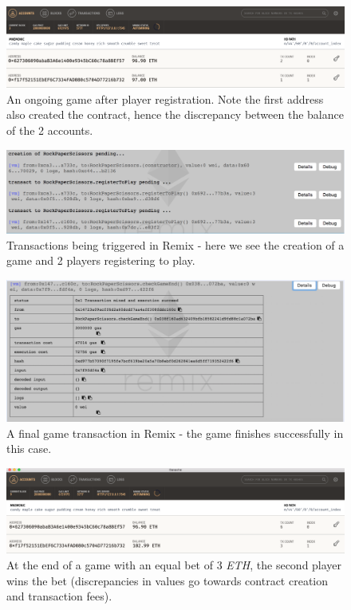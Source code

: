 \documentclass[a4paper, twoside]{article}
\begin{document}
\begin{figure}[!h]
	\centering
	\includegraphics[width=\textwidth]{screens/postRegistration.png}	
	\caption{An ongoing game after player registration. Note the first address also created the contract, hence the discrepancy between the balance of the 2 accounts.}
\end{figure}
\begin{figure}[!h]
	\centering
	\includegraphics[width=\textwidth]{screens/initialTransactions.png}	
	\caption{Transactions being triggered in Remix - here we see the creation of a game and 2 players registering to play.}
\end{figure}
\begin{figure}[!h]
	\centering
	\includegraphics[width=\textwidth]{screens/gameEnd.png}	
	\caption{A final game transaction in Remix - the game finishes successfully in this case.}
\end{figure}
\begin{figure}[!h]
	\centering
	\includegraphics[width=\textwidth]{screens/matchEnd.png}	
	\caption{At the end of a game with an equal bet of 3 \textit{ETH}, the second player wins the bet (discrepancies in values go towards contract creation and transaction fees).}
\end{figure}
\end{document}
